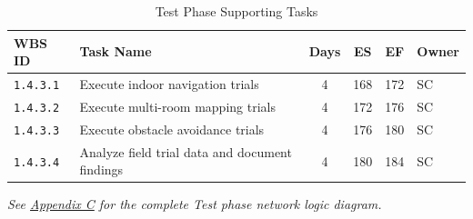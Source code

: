 \begin{table}[H]
\centering
\small
{}
\begin{tabular}{|l|p{5cm}|c|c|c|l|}
\hline
\rowcolor{testgreen!40}
\textbf{WBS ID} & \textbf{Task Name} & \textbf{Days} & \textbf{ES} & \textbf{EF} & \textbf{Owner} \\
\hline
\texttt{1.4.3.1} & Execute indoor navigation trials & 4 & 168 & 172 & SC \\
\hline
\texttt{1.4.3.2} & Execute multi-room mapping trials & 4 & 172 & 176 & SC \\
\hline
\texttt{1.4.3.3} & Execute obstacle avoidance trials & 4 & 176 & 180 & SC \\
\hline
\texttt{1.4.3.4} & Analyze field trial data and document findings & 4 & 180 & 184 & SC \\
\hline
\end{tabular}
\caption{Test Phase Supporting Tasks}
\label{tab:nld_test_supporting}
\end{table}

\noindent\textit{See \hyperref[app:nld]{Appendix C} for the complete Test phase network logic diagram.}
